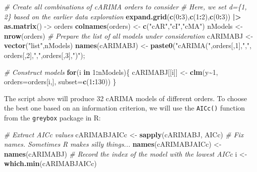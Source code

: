 \documentclass[
]{book}
\newenvironment{Shaded}{\begin{snugshade}}{\end{snugshade}}
\newcommand{\CommentTok}[1]{\textcolor[rgb]{0.56,0.35,0.01}{\textit{#1}}}
\newcommand{\ControlFlowTok}[1]{\textcolor[rgb]{0.13,0.29,0.53}{\textbf{#1}}}
\newcommand{\DataTypeTok}[1]{\textcolor[rgb]{0.13,0.29,0.53}{#1}}
\newcommand{\DecValTok}[1]{\textcolor[rgb]{0.00,0.00,0.81}{#1}}
\newcommand{\ErrorTok}[1]{\textcolor[rgb]{0.64,0.00,0.00}{\textbf{#1}}}
\newcommand{\KeywordTok}[1]{\textcolor[rgb]{0.13,0.29,0.53}{\textbf{#1}}}
\newcommand{\NormalTok}[1]{#1}
\newcommand{\OperatorTok}[1]{\textcolor[rgb]{0.81,0.36,0.00}{\textbf{#1}}}
\newcommand{\StringTok}[1]{\textcolor[rgb]{0.31,0.60,0.02}{#1}}
\begin{document}
\begin{Shaded}
\begin{Highlighting}[]
\CommentTok{\# Create all combinations of cARIMA orders to consider}
\CommentTok{\# Here, we set d=\{1, 2\} based on the earlier data exploration}
\KeywordTok{expand.grid}\NormalTok{(}\KeywordTok{c}\NormalTok{(}\DecValTok{0}\OperatorTok{:}\DecValTok{3}\NormalTok{),}\KeywordTok{c}\NormalTok{(}\DecValTok{1}\OperatorTok{:}\DecValTok{2}\NormalTok{),}\KeywordTok{c}\NormalTok{(}\DecValTok{0}\OperatorTok{:}\DecValTok{3}\NormalTok{)) }\OperatorTok{|}\ErrorTok{\textgreater{}}
\StringTok{    }\KeywordTok{as.matrix}\NormalTok{() {-}\textgreater{}}\StringTok{ }\NormalTok{orders}
\KeywordTok{colnames}\NormalTok{(orders) \textless{}{-}}\StringTok{ }\KeywordTok{c}\NormalTok{(}\StringTok{"cAR"}\NormalTok{,}\StringTok{"cI"}\NormalTok{,}\StringTok{"cMA"}\NormalTok{)}
\NormalTok{nModels \textless{}{-}}\StringTok{ }\KeywordTok{nrow}\NormalTok{(orders)}
\CommentTok{\# Prepare the list of all models under consideration}
\NormalTok{cARIMABJ \textless{}{-}}\StringTok{ }\KeywordTok{vector}\NormalTok{(}\StringTok{"list"}\NormalTok{,nModels)}
\KeywordTok{names}\NormalTok{(cARIMABJ) \textless{}{-}}\StringTok{ }\KeywordTok{paste0}\NormalTok{(}\StringTok{"cARIMA("}\NormalTok{,orders[,}\DecValTok{1}\NormalTok{],}\StringTok{","}\NormalTok{,}
\NormalTok{                          orders[,}\DecValTok{2}\NormalTok{],}\StringTok{","}\NormalTok{,orders[,}\DecValTok{3}\NormalTok{],}\StringTok{")"}\NormalTok{);}

\CommentTok{\# Construct models}
\ControlFlowTok{for}\NormalTok{(i }\ControlFlowTok{in} \DecValTok{1}\OperatorTok{:}\NormalTok{nModels)\{}
\NormalTok{    cARIMABJ[[i]] \textless{}{-}}\StringTok{ }\KeywordTok{clm}\NormalTok{(y}\OperatorTok{\textasciitilde{}}\DecValTok{1}\NormalTok{, }\DataTypeTok{orders=}\NormalTok{orders[i,], }\DataTypeTok{subset=}\KeywordTok{c}\NormalTok{(}\DecValTok{1}\OperatorTok{:}\DecValTok{130}\NormalTok{))}
\NormalTok{\}}
\end{Highlighting}
\end{Shaded}

The script above will produce 32 cARIMA models of different orders. To choose the best one based on an information criterion, we will use the \texttt{AICc()} function from the \texttt{greybox} package in R:

\begin{Shaded}
\begin{Highlighting}[]
\CommentTok{\# Extract AICc values}
\NormalTok{cARIMABJAICc \textless{}{-}}\StringTok{ }\KeywordTok{sapply}\NormalTok{(cARIMABJ, AICc)}
\CommentTok{\# Fix names. Sometimes R makes silly things...}
\KeywordTok{names}\NormalTok{(cARIMABJAICc) \textless{}{-}}\StringTok{ }\KeywordTok{names}\NormalTok{(cARIMABJ)}
\CommentTok{\# Record the index of the model with the lowest AICc}
\NormalTok{i \textless{}{-}}\StringTok{ }\KeywordTok{which.min}\NormalTok{(cARIMABJAICc)}
\end{Highlighting}
\end{Shaded}
\end{document}

